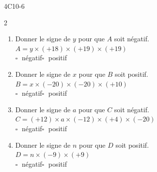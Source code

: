 \begin{EXO}{}{4C10-6}
\begin{multicols}{2}
\begin{enumerate}[itemsep=2em]
	\item \begin{minipage}[t]{\linewidth} Donner le signe de $y$ pour que $A$ soit négatif. \\$ A =  y \times (+18)\times (+19)\times (+19) $ \\ 
    
    	$\square\;$ négatif\qquad $\square\;$ positif\qquad \\
 \end{minipage}
	\item \begin{minipage}[t]{\linewidth} Donner le signe de $x$ pour que $B$ soit positif. \\$ B =  x \times (-20)\times (-20)\times (+10) $ \\ 
    
    	$\square\;$ négatif\qquad $\square\;$ positif\qquad \\
 \end{minipage}
	\item \begin{minipage}[t]{\linewidth} Donner le signe de $a$ pour que $C$ soit négatif. \\$ C =  (+12) \times a\times (-12)\times (+4)\times (-20) $ \\ 
    
    	$\square\;$ négatif\qquad $\square\;$ positif\qquad \\
 \end{minipage}
	\item \begin{minipage}[t]{\linewidth} Donner le signe de $n$ pour que $D$ soit positif. \\$ D =  n \times (-9)\times (+9) $ \\ 
    
    	$\square\;$ négatif\qquad $\square\;$ positif\qquad \\
 \end{minipage}
\end{enumerate}
\end{multicols}
\end{EXO}

